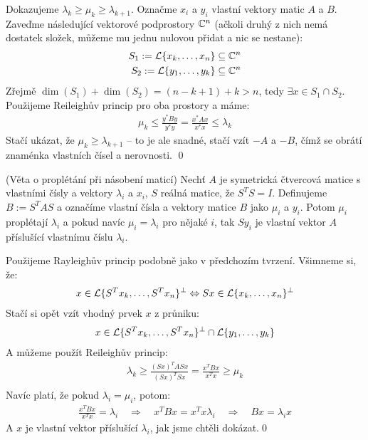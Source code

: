 \dk Dokazujeme $\lambda_k \geq \mu_k \geq \lambda_{k+1}$. Označme $x_i$ 
a $y_i$ vlastní vektory matic $A$ a $B$.  Zaveďme následující vektorové 
podprostory $\mathbb{C}^n$ (ačkoli druhý z nich nemá dostatek složek, můžeme mu jednu 
nulovou přidat a nic se nestane):
\begin{align}
S_1 := \mathcal{L}\{x_k, \dots, x_n\} \subseteq \mathbb{C}^n \\
S_2 := \mathcal{L}\{y_1, \dots, y_k\} \subseteq \mathbb{C}^n
\end{align}
Zřejmě $\dim(S_1) + \dim(S_2) = (n-k+1) + k > n$, tedy $\exists x \in S_1\cap S_2$. Použijeme 
Reileighův princip pro oba prostory a máme:
\begin{align}
	\mu_k \leq \frac{y^*By}{y^*y} = \frac{x^*Ax}{x^*x} \leq \lambda_k
\end{align}
Stačí ukázat, že $\mu_k \geq \lambda_{k+1}$ -- to je ale snadné, stačí vzít $-A$ 
a $-B$, čímž se obrátí znaménka vlastních čísel a nerovnosti. \qed

\vt (Věta o proplétání při násobení maticí) Nechť $A$ je symetrická čtvercová matice 
s vlastními čísly a vektory $\lambda_i$ a $x_i$, $S$ reálná matice, že $S^TS=I$.  
Definujeme $B := S^TAS$ a označíme vlastní čísla a vektory matice $B$ jako 
$\mu_i$ a $y_i$. Potom $\mu_i$ proplétají $\lambda_i$ a pokud navíc $\mu_i = 
\lambda_i$ pro nějaké $i$, tak $Sy_i$ je vlastní vektor $A$ příslušící vlastnímu 
číslu $\lambda_i$.

\dk Použijeme Rayleighův princip podobně jako v předchozím tvrzení. Všimneme 
si, že:
\begin{align}
	x \in \mathcal{L}\{ S^Tx_k, \dots, S^Tx_{n}\}^\perp \Leftrightarrow
	Sx \in \mathcal{L}\{ x_k, \dots, x_{n}\}^\perp
\end{align}
Stačí si opět vzít vhodný prvek $x$ z průniku:
\begin{align}
	x \in \mathcal{L}\{ S^Tx_k, \dots, S^Tx_{n}\}^\perp \cap \mathcal{L}\{y_1, \dots, y_k\}
\end{align}
A můžeme použít Reileighův princip:
\begin{align}
	\lambda_k \geq \frac{(Sx)^TASx}{(Sx)^TSx} = \frac{x^TBx}{x^Tx} \geq \mu_k \\
\end{align}
Navíc platí, že pokud $\lambda_i = \mu_i$, potom:
\begin{align}
	\frac{x^TBx}{x^Tx} = \lambda_i \quad\Rightarrow\quad x^TBx=x^Tx\lambda_i 
	\quad\Rightarrow\quad Bx = \lambda_i x
\end{align}
A $x$ je vlastní vektor příslušící $\lambda_i$, jak jsme chtěli dokázat.\qed

